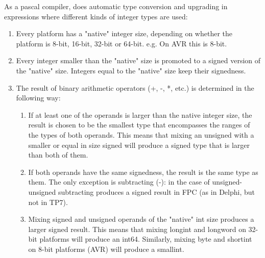 
As a pascal compiler, \fpc does automatic type conversion and upgrading 
in expressions where different kinds of integer types are used:
\begin{enumerate}
\item Every platform has a "native" integer size, depending on whether the
platform is 8-bit, 16-bit, 32-bit or 64-bit. e.g. On AVR this is 8-bit.
\item Every integer smaller than the "native" size is promoted to a signed
version of the "native" size. Integers equal to the "native" size keep their
signedness.
\item The result of binary arithmetic operators (+, -, *, etc.) is determined
in the following way:
\begin{enumerate}
\item If at least one of the operands is larger than the native integer size,
the result is chosen to be the smallest type that encompasses the ranges of
the types of both operands. This means that mixing an unsigned with a
smaller or equal in size signed will produce a signed type that is larger
than both of them.
\item If both operands have the same signedness, the result is the same
type as them. The only exception is subtracting (-): in the case of unsigned-unsigned
subtracting produces a signed result in FPC (as in Delphi, but not in TP7).
\item Mixing signed and unsigned operands of the "native" int size produces
a larger signed result. This means that mixing longint and longword on
32-bit platforms will produce an int64. Similarly, mixing byte and shortint on
8-bit platforms (AVR) will produce a smallint.
\end{enumerate}
\end{enumerate}

% 
%
